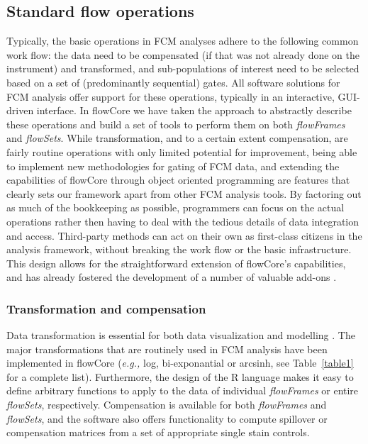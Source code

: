 \documentclass[10pt]{bmc_article}
\newcommand{\Rpackage}[1]{{\textsf{#1}}}
\newcommand{\Rclass}[1]{{\textit{#1}}}
\newenvironment{bmcformat}{\begin{raggedright}\baselineskip20pt\sloppy\setboolean{publ}{false}}{\end{raggedright}\baselineskip20pt\sloppy}
\begin{document}
\begin{bmcformat}
\subsection*{Standard flow operations}
Typically, the basic operations in FCM analyses adhere to the
following common work flow: the data need to be compensated (if that
was not already done on the instrument) and transformed, and
sub-populations of interest need to be selected based on a set of
(predominantly sequential) gates. All software solutions for FCM
analysis offer support for these operations, typically in an
interactive, GUI-driven interface. In \Rpackage{flowCore} we have
taken the approach to abstractly describe these operations and build a
set of tools to perform them on both \Rclass{flowFrames} and
\Rclass{flowSets}. While transformation, and to a certain extent
compensation, are fairly routine operations with only limited
potential for improvement, being able to implement new methodologies
for gating of FCM data, and extending the capabilities of
\Rpackage{flowCore} through object oriented programming are features
that clearly sets our framework apart from other FCM analysis
tools. By factoring out as much of the bookkeeping as possible,
programmers can focus on the actual operations rather then having to
deal with the tedious details of data integration and
access. Third-party methods can act on their own as first-class
citizens in the analysis framework, without breaking the work flow or
the basic infrastructure. This design allows for the straightforward
extension of \Rpackage{flowCore}'s capabilities, and has already
fostered the development of a number of valuable add-ons
\cite{lo2008agf,sarkar2008ufv}.

\subsubsection*{Transformation and compensation}
Data transformation is essential for both data visualization and
modelling \cite{lo2008agf}. The major transformations that are
routinely used in FCM analysis have been implemented in
\Rpackage{flowCore} (\textit{e.g.,} log, bi-exponantial or arcsinh,
see Table~\ref{table1} for a complete list). Furthermore, the design
of the R language makes it easy to define arbitrary functions to apply
to the data of individual \Rclass{flowFrames} or entire
\Rclass{flowSets}, respectively. Compensation is available for both
\Rclass{flowFrames} and \Rclass{flowSets}, and the software also
offers functionality to compute spillover or compensation matrices
from a set of appropriate single stain controls.


\end{bmcformat}
\end{document}
